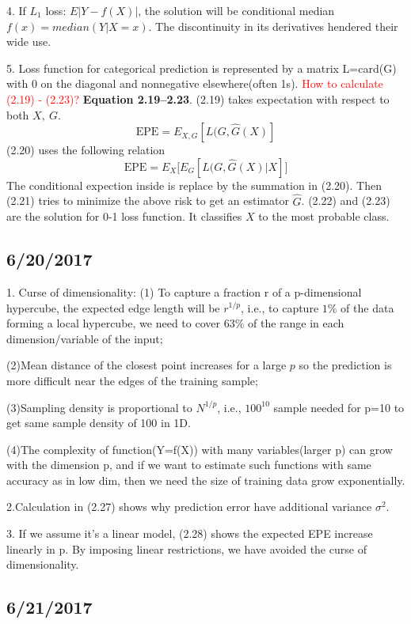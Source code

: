 \documentclass[a4paper, 12pt]{article}
\begin{document}
4. If $L_1$ loss: $E|Y-f(X)|$, the solution will be conditional median $f(x)= median(Y|X=x)$. The discontinuity in its derivatives hendered their wide use.

5. Loss function for categorical prediction is represented by a matrix L=card(G) with 0 on the diagonal and nonnegative elsewhere(often 1s).
\textcolor{red}{ How to calculate (2.19) - (2.23)?}
\vspace{6pt}
\noindent \textbf{Equation 2.19--2.23}. 
(2.19) takes expectation with respect to both $X,\ G$. 
$$
\mathrm{EPE} = E_{X,G}[L(G,\hat{G}(X)]
$$
(2.20) uses the following relation
$$
\mathrm{EPE} = E_X\Big[ E_G[L(G,\hat{G}(X) | X]\Big]
$$
The conditional expection inside is replace by the summation in
(2.20). Then (2.21) tries to minimize the above risk to get an
estimator $\hat{G}$. (2.22) and (2.23) are the solution for 0-1 loss
function. It classifies $X$ to the most probable class. 

\subsection*{6/20/2017}

1. Curse of dimensionality: (1) To capture a fraction r of a p-dimensional hypercube,  the expected edge length will be $r^{1/p}$, i.e., to capture $1\%$ of the data forming a local hypercube, we need to cover $63\%$ of the range in each dimension/variable of the input; 

(2)Mean distance of the closest point increases for a large $p$ so the prediction is more difficult near the edges of the training sample;

(3)Sampling density is proportional to $N^{1/p}$, i.e., $100^10$ sample needed for p=10 to get same sample density of 100 in 1D.

(4)The complexity of function(Y=f(X)) with many variables(larger p) can grow with the dimension p, and if we want to estimate such functions with same accuracy as in low dim, then we need the size of training data grow exponentially.

2.Calculation in (2.27) shows why prediction error have additional variance $\sigma^2$.

3. If we assume it's a linear model, (2.28) shows the expected EPE increase linearly in p. By imposing linear restrictions, we have avoided the curse of dimensionality.

\subsection*{6/21/2017}
\end{document}
